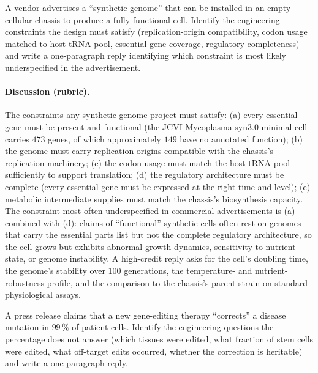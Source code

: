 \begin{exercise}
A vendor advertises a ``synthetic genome'' that can be installed in
an empty cellular chassis to produce a fully functional cell.
Identify the engineering constraints the design must satisfy
(replication-origin compatibility, codon usage matched to host tRNA
pool, essential-gene coverage, regulatory completeness) and write a
one-paragraph reply identifying which constraint is most likely
underspecified in the advertisement.
\end{exercise}

\paragraph{Discussion (rubric).} The constraints any synthetic-genome
project must satisfy: (a) every essential gene must be present and
functional (the JCVI Mycoplasma syn3.0 minimal cell carries $473$
genes, of which approximately $149$ have no annotated function);
(b) the genome must carry replication origins compatible with the
chassis's replication machinery; (c) the codon usage must match the
host tRNA pool sufficiently to support translation; (d) the regulatory
architecture must be complete (every essential gene must be expressed
at the right time and level); (e) metabolic intermediate supplies
must match the chassis's biosynthesis capacity. The constraint most
often underspecified in commercial advertisements is (a) combined
with (d): claims of ``functional'' synthetic cells often rest on
genomes that carry the essential parts list but not the complete
regulatory architecture, so the cell grows but exhibits abnormal
growth dynamics, sensitivity to nutrient state, or genome instability.
A high-credit reply asks for the cell's doubling time, the genome's
stability over $100$ generations, the temperature- and nutrient-
robustness profile, and the comparison to the chassis's parent
strain on standard physiological assays.

\begin{exercise}
A press release claims that a new gene-editing therapy ``corrects''
a disease mutation in $99\,\%$ of patient cells. Identify the
engineering questions the percentage does not answer (which tissues
were edited, what fraction of stem cells were edited, what off-target
edits occurred, whether the correction is heritable) and write a
one-paragraph reply.
\end{exercise}

